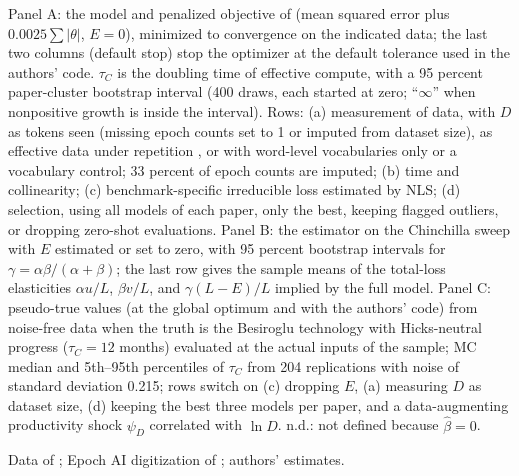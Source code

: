 \begin{table}[tp]
\begin{tablenotes}Panel A: the model and penalized objective of \citet{ho2024algorithmic} (mean squared error plus $0.0025\sum|\theta|$, $E=0$), minimized to convergence on the indicated data; the last two columns (default stop) stop the optimizer at the default tolerance used in the authors' code. $\tau_C$ is the doubling time of effective compute, with a 95 percent paper-cluster bootstrap interval (400 draws, each started at zero; ``$\infty$'' when nonpositive growth is inside the interval). Rows: (a) measurement of data, with $D$ as tokens seen (missing epoch counts set to 1 or imputed from dataset size), as effective data under repetition \citep[$R^*=15.4$;][]{muennighoff2023scaling}, or with word-level vocabularies only or a vocabulary control; 33 percent of epoch counts are imputed; (b) time and collinearity; (c) benchmark-specific irreducible loss estimated by NLS; (d) selection, using all models of each paper, only the best, keeping flagged outliers, or dropping zero-shot evaluations. Panel B: the \citet{besiroglu2024chinchilla} estimator on the Chinchilla sweep with $E$ estimated or set to zero, with 95 percent bootstrap intervals for $\gamma=\alpha\beta/(\alpha+\beta)$; the last row gives the sample means of the total-loss elasticities $\alpha u/L$, $\beta v/L$, and $\gamma(L-E)/L$ implied by the full model. Panel C: pseudo-true values (at the global optimum and with the authors' code) from noise-free data when the truth is the Besiroglu technology with Hicks-neutral progress ($\tau_C=12$ months) evaluated at the actual inputs of the sample; MC median and 5th--95th percentiles of $\tau_C$ from 204 replications with noise of standard deviation 0.215; rows switch on (c) dropping $E$, (a) measuring $D$ as dataset size, (d) keeping the best three models per paper, and a data-augmenting productivity shock $\psi_D$ correlated with $\ln D$. n.d.: not defined because $\hat\beta=0$.\end{tablenotes}
\begin{tablenotes}[Source]Data of \citet{ho2024algorithmic}; Epoch AI digitization of \citet{hoffmann2022training}; authors' estimates.\end{tablenotes}
\end{table}
